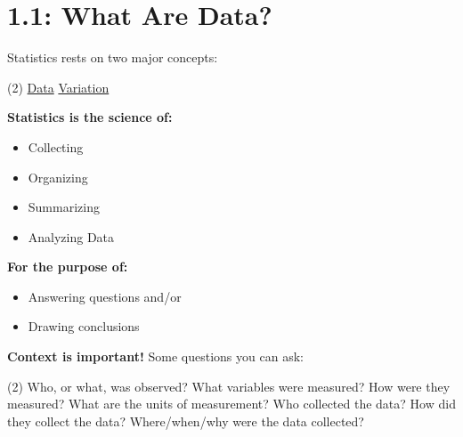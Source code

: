 \documentclass[../mathNotesPreamble]{subfiles}
\begin{document}
  \section{1.1: What Are Data?}
    Statistics rests on two major concepts:
    \begin{tasks}(2)
      \task \underline{Data}
      \task \underline{Variation}
    \end{tasks}

    \begin{minipage}[t]{0.5\linewidth}
      \textbf{Statistics is the science of:}
      \begin{itemize}
        \item Collecting
        \item Organizing
        \item Summarizing
        \item Analyzing Data
      \end{itemize}
    \end{minipage}%
    \begin{minipage}[t]{0.5\linewidth}
      \textbf{For the purpose of:}
      \begin{itemize}
        \item Answering questions and/or
        \item Drawing conclusions
      \end{itemize}
    \end{minipage}
    \vspace*{\baselineskip}

    \textbf{Context is important!} Some questions you can ask:
    \begin{tasks}[label=\textbullet](2)
      \task Who, or what, was observed?
      \task What variables were measured?
      \task How were they measured?
      \task What are the units of measurement?
      \task Who collected the data?
      \task How did they collect the data?
      \task* Where/when/why were the data collected?
    \end{tasks}
\end{document}
